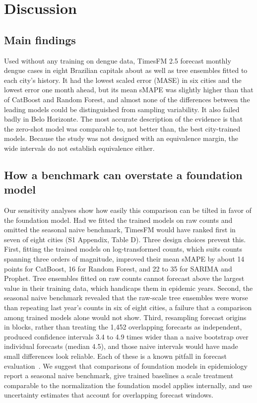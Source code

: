 \documentclass[10pt,letterpaper]{article}
\begin{document}
\section*{Discussion}
\subsection*{Main findings}
Used without any training on dengue data, TimesFM 2.5 forecast monthly dengue cases in eight Brazilian capitals about as well as tree ensembles fitted to each city's history. It had the lowest scaled error (MASE) in six cities and the lowest error one month ahead, but its mean sMAPE was slightly higher than that of CatBoost and Random Forest, and almost none of the differences between the leading models could be distinguished from sampling variability. It also failed badly in Belo Horizonte. The most accurate description of the evidence is that the zero-shot model was comparable to, not better than, the best city-trained models. Because the study was not designed with an equivalence margin, the wide intervals do not establish equivalence either.

\subsection*{How a benchmark can overstate a foundation model}
Our sensitivity analyses show how easily this comparison can be tilted in favor of the foundation model. Had we fitted the trained models on raw counts and omitted the seasonal naive benchmark, TimesFM would have ranked first in seven of eight cities (S1 Appendix, Table D). Three design choices prevent this. First, fitting the trained models on log-transformed counts, which suits counts spanning three orders of magnitude, improved their mean sMAPE by about 14 points for CatBoost, 16 for Random Forest, and 22 to 35 for SARIMA and Prophet. Tree ensembles fitted on raw counts cannot forecast above the largest value in their training data, which handicaps them in epidemic years. Second, the seasonal naive benchmark revealed that the raw-scale tree ensembles were worse than repeating last year's counts in six of eight cities, a failure that a comparison among trained models alone would not show. Third, resampling forecast origins in blocks, rather than treating the 1{,}452 overlapping forecasts as independent, produced confidence intervals 3.4 to 4.9 times wider than a naive bootstrap over individual forecasts (median 4.5), and those naive intervals would have made small differences look reliable. Each of these is a known pitfall in forecast evaluation~\cite{Hewamalage2023}. We suggest that comparisons of foundation models in epidemiology report a seasonal naive benchmark, give trained baselines a scale treatment comparable to the normalization the foundation model applies internally, and use uncertainty estimates that account for overlapping forecast windows.
\end{document}
